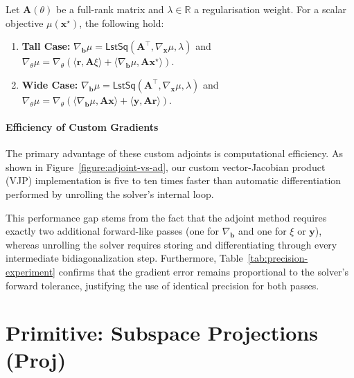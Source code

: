 \begin{theorem}
\label{theorem:lsq_gradients}
Let $\mathbf{A}(\theta)$ be a full-rank matrix and $\lambda \in \mathbb{R}$ a regularisation weight. For a scalar objective $\mu(\mathbf{x}^\star)$, the following hold:
\begin{enumerate}
\item \textbf{Tall Case:}
$\nabla_{\mathbf{b}}\mu = \textsf{LstSq}(\mathbf{A}^\top,\nabla_{\mathbf{x}}\mu, \lambda)$ and $\nabla_{\theta} \mu = \nabla_{\theta} (\langle \mathbf{r}, \mathbf{A} \xi \rangle + \langle \nabla_{\mathbf{b}} \mu, \mathbf{A} \mathbf{x}^\star \rangle)$.
\item \textbf{Wide Case:}
$\nabla_{\mathbf{b}}\mu = \textsf{LstSq}(\mathbf{A}^\top, \nabla_{\mathbf{x}}\mu, \lambda)$ and $\nabla_{\theta} \mu = \nabla_{\theta}(\langle \nabla_{\mathbf{b}} \mu, \mathbf{A} \mathbf{x} \rangle + \langle \mathbf{y}, \mathbf{A} \mathbf{r} \rangle)$.
\end{enumerate}
\end{theorem}

\paragraph{Efficiency of Custom Gradients}
The primary advantage of these custom adjoints is computational efficiency. As shown in Figure~\ref{figure:adjoint-vs-ad}, our custom vector-Jacobian product (VJP) implementation is five to ten times faster than automatic differentiation performed by unrolling the solver's internal loop. 


\label{figure:adjoint-vs-ad}

This performance gap stems from the fact that the adjoint method requires exactly two additional forward-like passes (one for $\nabla_{\mathbf{b}}$ and one for $\xi$ or $\mathbf{y}$), whereas unrolling the solver requires storing and differentiating through every intermediate bidiagonalization step. Furthermore, Table~\ref{tab:precision-experiment} confirms that the gradient error remains proportional to the solver's forward tolerance, justifying the use of identical precision for both passes.

\section{Primitive: Subspace Projections (\textsf{Proj})}
\label{sec:subspace_projections}

